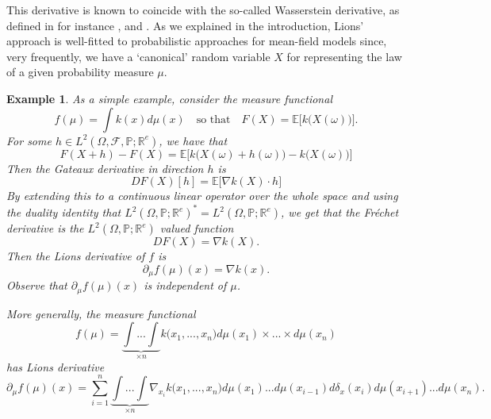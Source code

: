 \documentclass[a4paper,11pt,twoside]{article}
\numberwithin{equation}{section}
\theoremstyle{plain}
\newtheorem{example}[theorem]{Example}
\newcommand{\bE}{\mathbb{E}}
\newcommand{\bP}{\mathbb{P}}
\newcommand{\bR}{\mathbb{R}}
\newcommand{\cF}{\mathcal{F}}
\newcommand{\1}{\mathbbm{1}}
\begin{document}
	This derivative is known to coincide with the so-called Wasserstein derivative, as defined in for instance \cite{Ambrosio2008Gradient}, \cite{CarmonaDelarue2017book1} and \cite{GangboDifferentiability2019}. As we explained in the introduction, Lions' approach is well-fitted to probabilistic approaches for mean-field models since, very frequently, we have  a `canonical' random variable $X$ for representing the law of a given probability measure $\mu$. 
	
	\begin{example}
		\label{example:Simple_Lions1}
		As a simple example, consider the measure functional
		\begin{equation}
			\label{eq:example:Simple_Lions1.1}
			f(\mu) = \int k(x) d\mu(x) \quad \mbox{so that} \quad F(X) = \bE \Big[ k\big( X(\omega) \big) \Big]. 
		\end{equation}
		For some $h\in L^2(\Omega, \cF, \bP; \bR^e)$, we have that
		$$
		F(X+h) - F(X) = \bE\Big[ k\big( X(\omega) + h(\omega) \big) - k\big( X(\omega) \big) \Big]
		$$
		Then the Gateaux derivative in direction $h$ is
		$$
		DF(X) [h] = \bE\Big[ \nabla k(X) \cdot h \Big]
		$$
		By extending this to a continuous linear operator over the whole space and using the duality identity that $L^2(\Omega, \bP; \bR^e)^* = L^2(\Omega, \bP; \bR^e)$, we get that the Fr\'echet derivative is the $L^2(\Omega, \bP; \bR^e)$ valued function
		$$
		DF(X) = \nabla k(X). 
		$$
		Then the Lions derivative of $f$ is
		$$
		\partial_\mu f(\mu)(x) = \nabla k(x). 
		$$
		Observe that $\partial_\mu f(\mu)(x)$ is independent of $\mu$. 
		
		More generally, the measure functional
		\begin{equation}
			\label{eq:example:Simple_Lions1.2}
			f(\mu) = \underbrace{\int ... \int}_{\times n} k\Big( x_1, ..., x_n \Big) d\mu(x_1) \times ... \times d\mu(x_n) 
		\end{equation}
		has Lions derivative
		$$
		\partial_\mu f(\mu)(x) = \sum_{i=1}^n \underbrace{\int ... \int}_{\times n} \nabla_{x_i} k\Big( x_1, ..., x_n \Big) d\mu(x_1)... d\mu(x_{i-1}) d\delta_x(x_i) d\mu(x_{i+1}) ... d\mu(x_n). 
		$$
		

\end{example}
\end{document}
